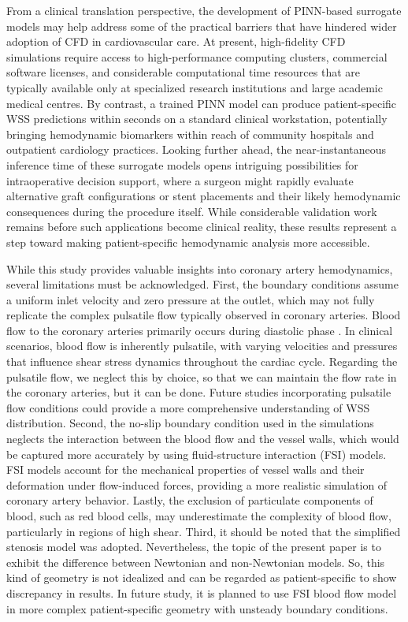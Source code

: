 ﻿\documentclass[12pt,a4paper]{article}
\theoremstyle{definition}
\numberwithin{equation}{section}
\begin{document}
{From a clinical translation perspective, the development of PINN-based surrogate models may help address some of the practical barriers that have hindered wider adoption of CFD in cardiovascular care. At present, high-fidelity CFD simulations require access to high-performance computing clusters, commercial software licenses, and considerable computational time resources that are typically available only at specialized research institutions and large academic medical centres. By contrast, a trained PINN model can produce patient-specific WSS predictions within seconds on a standard clinical workstation, potentially bringing hemodynamic biomarkers within reach of community hospitals and outpatient cardiology practices. Looking further ahead, the near-instantaneous inference time of these surrogate models opens intriguing possibilities for intraoperative decision support, where a surgeon might rapidly evaluate alternative graft configurations or stent placements and their likely hemodynamic consequences during the procedure itself. While considerable validation work remains before such applications become clinical reality, these results represent a step toward making patient-specific hemodynamic analysis more accessible.}

While this study provides valuable insights into coronary artery hemodynamics, several limitations must be acknowledged. First, the boundary conditions assume a uniform inlet velocity and zero pressure at the outlet, which may not fully replicate the complex pulsatile flow typically observed in coronary arteries. Blood flow to the coronary arteries primarily occurs during diastolic phase \cite{70, 71}. In clinical scenarios, blood flow is inherently pulsatile, with varying velocities and pressures that influence shear stress dynamics throughout the cardiac cycle. Regarding the pulsatile flow, we neglect this by choice, so that we can maintain the flow rate in the coronary arteries, but it can be done. Future studies incorporating pulsatile flow conditions could provide a more comprehensive understanding of WSS distribution. Second, the no-slip boundary condition used in the simulations neglects the interaction between the blood flow and the vessel walls, which would be captured more accurately by using fluid-structure interaction (FSI) models. FSI models account for the mechanical properties of vessel walls and their deformation under flow-induced forces, providing a more realistic simulation of coronary artery behavior. Lastly, the exclusion of particulate components of blood, such as red blood cells, may underestimate the complexity of blood flow, particularly in regions of high shear. Third, it should be noted that the simplified stenosis model was adopted. Nevertheless, the topic of the present paper is to exhibit the difference between Newtonian and non-Newtonian models. So, this kind of geometry is not idealized and can be regarded as patient-specific to show discrepancy in results. In future study, it is planned to use FSI blood flow model in more complex patient-specific geometry with unsteady boundary conditions. 
\end{document}
